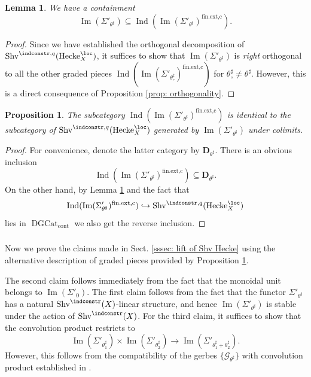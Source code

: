 \documentclass[10pt]{amsart}
\newcommand{\sssec}{\subsubsection}
\newtheorem{lemma}[subsubsection]{Lemma}
\newtheorem{prop}[subsubsection]{Proposition}
\theoremstyle{remark}
\newcommand{\on}{\operatorname}
\newcommand{\cG}{\mathcal{G}}
\newcommand{\DGcat}{\on{DGCat}_{\on{cont}}}
\newcommand{\Shv}{\on{Shv}}
\DeclareMathOperator{\Ind}{Ind}
\newcommand{\bD}{\mathbf{D}}
\newcommand{\Hecke}{\on{Hecke}}
\begin{document}
\begin{lemma}\label{lem: Im containment}
    We have a containment
    \[\on{Im}(\Sigma'_{\theta^{\sharp}})\subseteq\Ind(\on{Im}(\Sigma'_{\theta^{\sharp}})^{\on{fin.ext,c}}).\]
\end{lemma}
\begin{proof}
    Since we have established the orthogonal decomposition of $\Shv^{\indconstr,q}(\Hecke^{\loc}_X)$, it suffices to show that $\on{Im}(\Sigma'_{\theta^{\sharp}})$ is \emph{right} orthogonal to all the other graded pieces $\Ind(\on{Im}(\Sigma'_{\theta^{\sharp }_{
    \circ
    }})^{\on{fin.ext,c}})$ for $\theta^{\sharp}_{\circ}\ne \theta^{\sharp}$. However, this is a direct consequence of Proposition \ref{prop: orthogonality}.
\end{proof}
\begin{prop}\label{prop: graded pieces alternative}
 The subcategory
    $\Ind(\on{Im}(\Sigma'_{\theta^{\sharp}})^{\on{fin.ext,c}})$ is identical to the subcategory of $\Shv^{\indconstr,q}(\Hecke^{\loc}_X)$ generated by $\on{Im}(\Sigma'_{\theta^{\sharp}})$ under colimits.
\end{prop}
\begin{proof}
    For convenience, denote the latter category by $\bD_{\theta^{\sharp}}$. There is an obvious inclusion 
    \[\Ind(\on{Im}(\Sigma'_{\theta^{\sharp}})^{\on{fin.ext,c}})\subseteq \bD_{\theta^{\sharp}}.\]
    On the other hand, by Lemma \ref{lem: Im containment} and the fact that 
    \[\Ind(\on{Im}(\Sigma'_{\theta^{\sharp}})^{\on{fin.ext,c}})\hookrightarrow \Shv^{\indconstr,q}(\Hecke^{\loc}_X)\]
    lies in $\DGcat$ we also get the reverse inclusion.
\end{proof}

\sssec{}
Now we prove the claims made in Sect. \ref{sssec: lift of Shv Hecke} using the alternative description of graded pieces provided by Proposition \ref{prop: graded pieces alternative}.
\medskip

The second claim follows immediately from the fact that the monoidal unit belongs to $\on{Im}(\Sigma'_{0})$.
The first claim follows from the fact that the functor $\Sigma'_{\theta^{\sharp}}$ has a natural $\Shv^{\indconstr}(X)$-linear structure, and hence $\on{Im}(\Sigma'_{\theta^{\sharp}})$ is stable under the action of
$\Shv^{\indconstr}(X)$.
For the third claim, it suffices to show that the convolution product restricts to
\[\on{Im}(\Sigma'_{\theta^{\sharp}_1})\times \on{Im}(\Sigma'_{\theta^{\sharp}_2})\rightarrow \on{Im}(\Sigma'_{\theta^{\sharp}_1+\theta^{\sharp}_2}).\]
However, this follows from the compatibility of the gerbes $\{\cG_{\theta^{\sharp}}\}$ with convolution product established in \cite[Lemma 5.2.3]{ZhaoNew}.
\medskip
\end{document}
